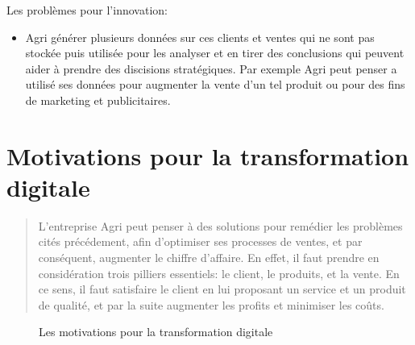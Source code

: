\documentclass[a4paper]{report}
\begin{document}
\begin{doublespace}
Les problèmes pour l'innovation:

\begin{itemize}
\item
  Agri générer plusieurs données sur ces clients et ventes qui ne sont
  pas stockée puis utilisée pour les analyser et en tirer des
  conclusions qui peuvent aider à prendre des discisions stratégiques.
  Par exemple Agri peut penser a utilisé ses données pour augmenter la
  vente d'un tel produit ou pour des fins de marketing et publicitaires.
\end{itemize}

\chapter{Motivations pour la transformation digitale}
\fancyhead[L]{\hspace*{5cm}}

\begin{quote}
L'entreprise Agri peut penser à des solutions pour remédier les
problèmes cités précédement, afin d'optimiser ses processes de ventes,
et par conséquent, augmenter le chiffre d'affaire. En effet, il faut
prendre en considération trois pilliers essentiels: le client, le
produits, et la vente. En ce sens, il faut satisfaire le client en lui
proposant un service et un produit de qualité, et par la suite augmenter
les profits et minimiser les coûts.
\end{quote}

\begin{figure}[H] 
	\begin{center}
		\caption{Les motivations pour la transformation digitale}
	\end{center}
\end{figure}


\end{doublespace}
\end{document}

